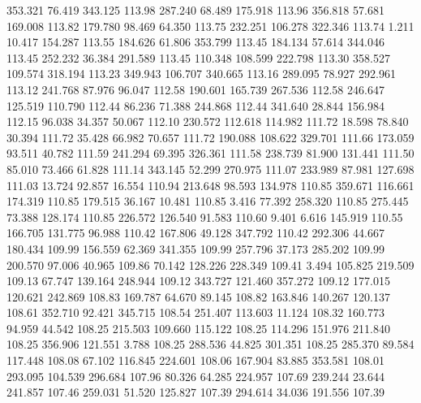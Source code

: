  353.321   76.419  343.125       113.98
 287.240   68.489  175.918       113.96
 356.818   57.681  169.008       113.82
 179.780   98.469   64.350       113.75
 232.251  106.278  322.346       113.74
   1.211   10.417  154.287       113.55
 184.626   61.806  353.799       113.45
 184.134   57.614  344.046       113.45
 252.232   36.384  291.589       113.45
 110.348  108.599  222.798       113.30
 358.527  109.574  318.194       113.23
 349.943  106.707  340.665       113.16
 289.095   78.927  292.961       113.12
 241.768   87.976   96.047       112.58
 190.601  165.739  267.536       112.58
 246.647  125.519  110.790       112.44
  86.236   71.388  244.868       112.44
 341.640   28.844  156.984       112.15
  96.038   34.357   50.067       112.10
 230.572  112.618  114.982       111.72
  18.598   78.840   30.394       111.72
  35.428   66.982   70.657       111.72
 190.088  108.622  329.701       111.66
 173.059   93.511   40.782       111.59
 241.294   69.395  326.361       111.58
 238.739   81.900  131.441       111.50
  85.010   73.466   61.828       111.14
 343.145   52.299  270.975       111.07
 233.989   87.981  127.698       111.03
  13.724   92.857   16.554       110.94
 213.648   98.593  134.978       110.85
 359.671  116.661  174.319       110.85
 179.515   36.167   10.481       110.85
   3.416   77.392  258.320       110.85
 275.445   73.388  128.174       110.85
 226.572  126.540   91.583       110.60
   9.401    6.616  145.919       110.55
 166.705  131.775   96.988       110.42
 167.806   49.128  347.792       110.42
 292.306   44.667  180.434       109.99
 156.559   62.369  341.355       109.99
 257.796   37.173  285.202       109.99
 200.570   97.006   40.965       109.86
  70.142  128.226  228.349       109.41
   3.494  105.825  219.509       109.13
  67.747  139.164  248.944       109.12
 343.727  121.460  357.272       109.12
 177.015  120.621  242.869       108.83
 169.787   64.670   89.145       108.82
 163.846  140.267  120.137       108.61
 352.710   92.421  345.715       108.54
 251.407  113.603   11.124       108.32
 160.773   94.959   44.542       108.25
 215.503  109.660  115.122       108.25
 114.296  151.976  211.840       108.25
 356.906  121.551    3.788       108.25
 288.536   44.825  301.351       108.25
 285.370   89.584  117.448       108.08
  67.102  116.845  224.601       108.06
 167.904   83.885  353.581       108.01
 293.095  104.539  296.684       107.96
  80.326   64.285  224.957       107.69
 239.244   23.644  241.857       107.46
 259.031   51.520  125.827       107.39
 294.614   34.036  191.556       107.39

